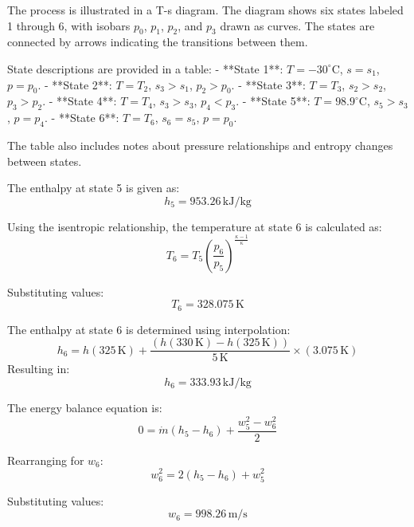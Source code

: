 The process is illustrated in a T-s diagram. The diagram shows six states labeled 1 through 6, with isobars \( p_0 \), \( p_1 \), \( p_2 \), and \( p_3 \) drawn as curves. The states are connected by arrows indicating the transitions between them.  

State descriptions are provided in a table:  
- **State 1**: \( T = -30^\circ\text{C} \), \( s = s_1 \), \( p = p_0 \).  
- **State 2**: \( T = T_2 \), \( s_3 > s_1 \), \( p_2 > p_0 \).  
- **State 3**: \( T = T_3 \), \( s_2 > s_2 \), \( p_3 > p_2 \).  
- **State 4**: \( T = T_4 \), \( s_3 > s_3 \), \( p_4 < p_3 \).  
- **State 5**: \( T = 98.9^\circ\text{C} \), \( s_5 > s_3 \), \( p = p_4 \).  
- **State 6**: \( T = T_6 \), \( s_6 = s_5 \), \( p = p_0 \).  

The table also includes notes about pressure relationships and entropy changes between states.

The enthalpy at state 5 is given as:  
\[
h_5 = 953.26 \, \text{kJ/kg}
\]  

Using the isentropic relationship, the temperature at state 6 is calculated as:  
\[
T_6 = T_5 \left( \frac{p_6}{p_5} \right)^{\frac{\kappa - 1}{\kappa}}
\]  

Substituting values:  
\[
T_6 = 328.075 \, \text{K}
\]  

The enthalpy at state 6 is determined using interpolation:  
\[
h_6 = h(325 \, \text{K}) + \frac{(h(330 \, \text{K}) - h(325 \, \text{K}))}{5 \, \text{K}} \times (3.075 \, \text{K})
\]  
Resulting in:  
\[
h_6 = 333.93 \, \text{kJ/kg}
\]  

The energy balance equation is:  
\[
0 = \dot{m} \left( h_5 - h_6 \right) + \frac{w_5^2 - w_6^2}{2}
\]  

Rearranging for \( w_6 \):  
\[
w_6^2 = 2 \left( h_5 - h_6 \right) + w_5^2
\]  

Substituting values:  
\[
w_6 = 998.26 \, \text{m/s}
\]